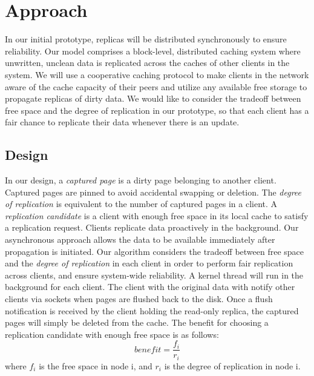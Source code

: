\section{Approach}

In our initial prototype, replicas will be distributed
synchronously to ensure reliability. Our model comprises a
block-level, distributed caching system where unwritten,
unclean data is replicated across the caches of other
clients in the system. We will use a cooperative caching
protocol to make clients in the network aware of the cache
capacity of their peers and utilize any available free storage
to propagate replicas of dirty data. We would like to consider
the tradeoff between free space and the degree of replication
in our prototype, so that each client has a fair chance to
replicate their data whenever there is an update.


\subsection{Design}

In our design, a \textit{captured page} is a dirty page belonging to another client.
Captured pages are pinned to avoid accidental swapping or deletion. The
\textit{degree of replication} is equivalent to the number of captured pages in a
client. A \textit{replication candidate} is a client with enough free space in its
local cache to satisfy a replication request. Clients replicate data proactively in
the background. Our asynchronous approach allows the data to be available immediately
after propagation is initiated. Our algorithm considers the tradeoff between free
space and the \textit{degree of replication} in each client in order to perform fair
replication across clients, and ensure system-wide reliability. A kernel thread will
run in the background for each client. The client with the original data with notify
other clients via sockets when pages are flushed back to the disk. Once a flush notification
is received by the client holding the read-only replica, the captured pages will simply be
deleted from the cache. The benefit for choosing a replication candidate with enough free
space is as follows: \[{benefit}=\frac{f_i}{r_i}\] where $f_i$ is the free space in node i,
and $r_i$ is the degree of replication in node i.


